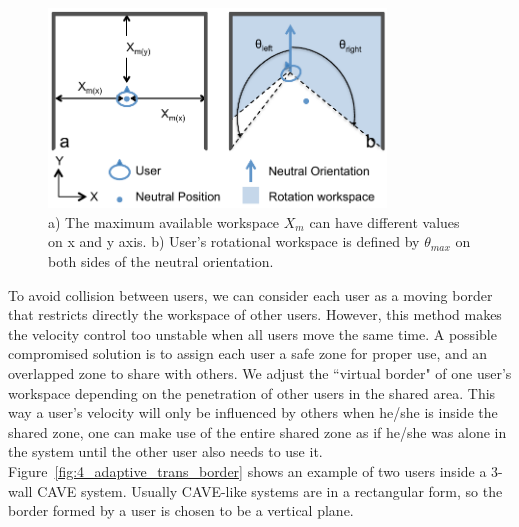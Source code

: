 \begin{figure}[htb]
\begin{center}
\includegraphics[width=0.8\textwidth]{figures/ch4/workspace_border}
\par\end{center}
\caption{\label{fig:4_workspace_border}a) The maximum available workspace $X_{m}$ can have different values on x and y axis. b) User's rotational workspace is defined by $\theta_{max}$ on both sides of the neutral orientation.}
\end{figure}

To avoid collision between users, we can consider each user as a moving border that restricts directly the workspace of other users. However, this method makes the velocity control too unstable when all users move the same time. A possible compromised solution is to assign each user a safe zone for proper use, and an overlapped zone to share with others. We adjust the ``virtual border" of one user's workspace depending on the penetration of other users in the shared area. This way a user's velocity will only be influenced by others when he/she is inside the shared zone, one can make use of the entire shared zone as if he/she was alone in the system until the other user also needs to use it. Figure~\ref{fig:4_adaptive_trans_border} shows an example of two users inside a 3-wall CAVE system. Usually CAVE-like systems are in a rectangular form, so the border formed by a user is chosen to be a vertical plane.

